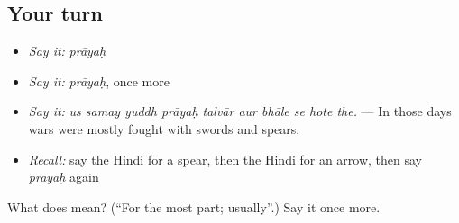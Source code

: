 \subsection*{Your turn}
\begin{itemize}
\raggedright
  \item \emph{Say it:} \emph{prāyaḥ}
  \item \emph{Say it:} \emph{prāyaḥ}, once more
  \item \emph{Say it:} \emph{us samay yuddh prāyaḥ talvār aur bhāle se hote the.} — In those days wars were mostly fought with swords and spears.
  \item \emph{Recall:} say the Hindi for a spear, then the Hindi for an arrow, then say \emph{prāyaḥ} again
\end{itemize}

\begin{tcolorbox}[breakable,colback=teal!4,colframe=teal!35!black,title={Before you move on}]
What does  mean? (\textquotedblleft{}For the most part; usually\textquotedblright{}.) Say it once more.
\end{tcolorbox}
